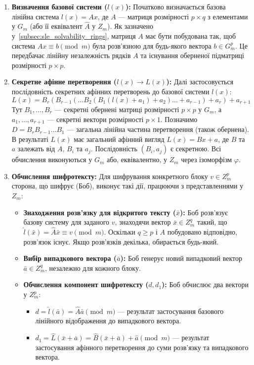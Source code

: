 \begin{enumerate}
    \item \textbf{Визначення базової системи ($l(x)$):} Початково визначається базова лінійна система $l(x) = Ax$, де $A$ — матриця розмірності $p \times q$ з елементами у $G_m$ (або її еквівалент $\hat{A}$ у $Z_m$).
    Як зазначено у~\ref{subsec:sle_solvability_rings}, матриця $A$ має бути побудована так, щоб система $Ax \equiv b \pmod{m}$ була розв'язною для будь-якого вектора $b \in G_m^p$.
    Це передбачає лінійну незалежність рядків $A$ та існування оберненої підматриці розмірності $p \times p$.

    \item \textbf{Секретне афінне перетворення ($l(x) \to L(x)$):} Далі застосовується послідовність секретних афінних перетворень до базової системи $l(x)$:
    \[
        L(x) = B_r(B_{r-1}(\ldots B_2(B_1(l(x)+a_1)+a_2)\ldots + a_{r-1})+a_r)+a_{r+1}
    \]
    Тут $B_1, \ldots, B_r$ — секретні обернені матриці розмірності $p \times p$ у $G_m$, а $a_1, \ldots, a_{r+1}$ — секретні вектори розмірності $p \times 1$.
    Позначимо $D = B_r B_{r-1} \ldots B_1$ — загальна лінійна частина перетворення (також обернена).
    В результаті $L(x)$ має загальний афінний вигляд $L(x) = Bx + a$, де $B$ та $a$ залежать від $A$, $B_i$ та $a_j$.
    Послідовність $(B_i, a_j)$ є секретною.
    Всі обчислення виконуються у $G_m$ або, еквівалентно, у $Z_m$ через ізоморфізм $\varphi$.

    \item \textbf{Обчислення шифротексту:} Для шифрування конкретного блоку $v \in Z_m^p$ сторона, що шифрує (Боб), виконує такі дії, працюючи з представленнями у $Z_m$:
    \begin{itemize}
        \item \textbf{Знаходження розв'язку для відкритого тексту ($\bar{x}$):} Боб розв'язує базову систему для заданого $v$, знаходячи вектор $\bar{x} \in Z_m^q$ такий, що $\hat{l}(\bar{x}) = \hat{A}\bar{x} \equiv v \pmod{m}$.
        Оскільки $q \geq p$ і $A$ побудовано відповідно, розв'язок існує.
        Якщо розв'язків декілька, обирається будь-який.
        \item \textbf{Вибір випадкового вектора ($\bar{a}$):} Боб генерує новий випадковий вектор $\bar{a} \in Z_m^q$, незалежно для кожного блоку.
        \item \textbf{Обчислення компонент шифротексту ($d, d_1$):} Боб обчислює два вектори у $Z_m^p$:
        \begin{itemize}
            \item $d = \hat{l}(\bar{a}) = \hat{A}\bar{a} \pmod{m}$ — результат застосування базового лінійного відображення до випадкового вектора.
            \item $d_1 = \hat{L}(\bar{x} + \bar{a}) = \hat{B}(\bar{x} + \bar{a}) + \hat{a} \pmod{m}$ — результат застосування афінного перетворення до суми розв'язку та випадкового вектора.
        \end{itemize}
    \end{itemize}


\end{enumerate}
